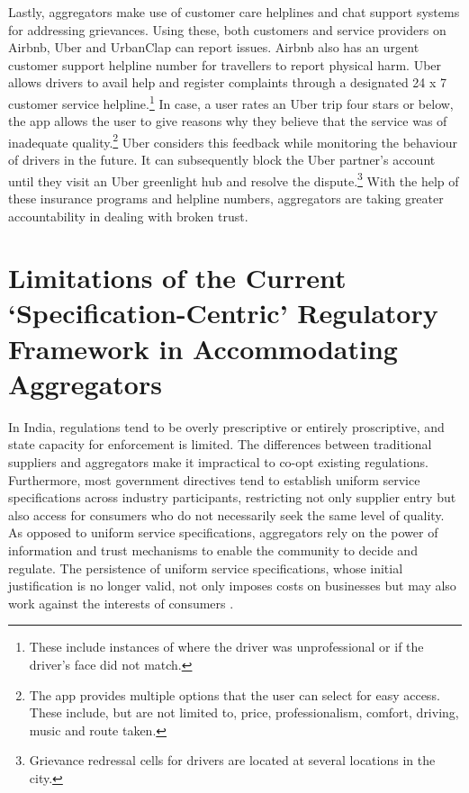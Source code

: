 \documentclass[a4paper, 12pt, twoside]{article}
\begin{document}
Lastly, aggregators make use of customer care helplines and chat support systems for addressing grievances. Using these, both customers and service providers on Airbnb, Uber and UrbanClap can report issues. Airbnb also has an urgent customer support helpline number for travellers to report physical harm. Uber allows drivers to avail help and register complaints through a designated 24 x 7 customer service helpline.\footnote{These include instances of where the driver was unprofessional or if the driver’s face did not match.}  In case, a user rates an Uber trip four stars or below, the app allows the user to give reasons why they believe that the service was of inadequate quality.\footnote{The app provides multiple options that the user can select for easy access. These include, but are not limited to, price, professionalism, comfort, driving, music and route taken.} Uber considers this feedback while monitoring the behaviour of drivers in the future. It can subsequently block the Uber partner's account until they visit an Uber greenlight hub and resolve the dispute.\footnote{Grievance redressal cells for drivers are located at several locations in the city.}  With the help of these insurance programs and helpline numbers, aggregators are taking greater accountability in dealing with broken trust.

                    \section{Limitations of the Current ‘Specification-Centric’ Regulatory Framework in Accommodating \\ Aggregators}
In India, regulations tend to be overly prescriptive or entirely proscriptive, and state capacity for enforcement is limited. The differences between traditional suppliers and aggregators make it impractical to co-opt existing regulations. Furthermore, most government directives tend to establish uniform service specifications across industry participants, restricting not only supplier entry but also access for consumers who do not necessarily seek the same level of quality. As opposed to uniform service specifications, aggregators rely on the power of information and trust mechanisms to enable the community to decide and regulate. The persistence of uniform service specifications, whose initial justification is no longer valid, not only imposes costs on businesses but may also work against the interests of consumers \parencite{koopman2014sharing}. \\  
\end{document}
